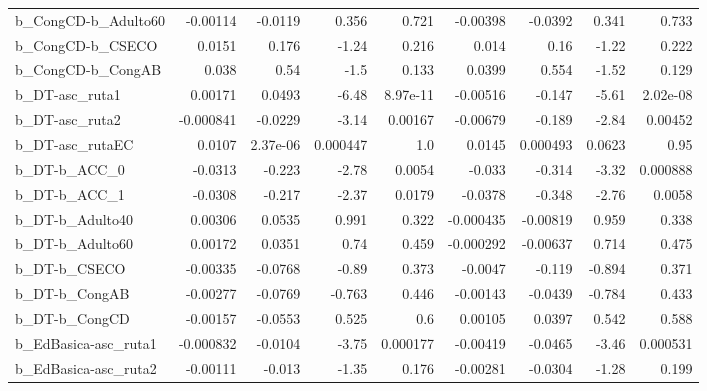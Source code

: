 \begin{tabular}{lrrrrrrrr}
b\_CongCD-b\_Adulto60        &    -0.00114 &      -0.0119 &     0.356 &    0.721 &   -0.00398 &     -0.0392 &        0.341 &         0.733 \\
b\_CongCD-b\_CSECO           &      0.0151 &        0.176 &     -1.24 &    0.216 &      0.014 &        0.16 &        -1.22 &         0.222 \\
b\_CongCD-b\_CongAB          &       0.038 &         0.54 &      -1.5 &    0.133 &     0.0399 &       0.554 &        -1.52 &         0.129 \\
b\_DT-asc\_ruta1             &     0.00171 &       0.0493 &     -6.48 & 8.97e-11 &   -0.00516 &      -0.147 &        -5.61 &      2.02e-08 \\
b\_DT-asc\_ruta2             &   -0.000841 &      -0.0229 &     -3.14 &  0.00167 &   -0.00679 &      -0.189 &        -2.84 &       0.00452 \\
b\_DT-asc\_rutaEC            &      0.0107 &     2.37e-06 &  0.000447 &      1.0 &     0.0145 &    0.000493 &       0.0623 &          0.95 \\
b\_DT-b\_ACC\_0               &     -0.0313 &       -0.223 &     -2.78 &   0.0054 &     -0.033 &      -0.314 &        -3.32 &      0.000888 \\
b\_DT-b\_ACC\_1               &     -0.0308 &       -0.217 &     -2.37 &   0.0179 &    -0.0378 &      -0.348 &        -2.76 &        0.0058 \\
b\_DT-b\_Adulto40            &     0.00306 &       0.0535 &     0.991 &    0.322 &  -0.000435 &    -0.00819 &        0.959 &         0.338 \\
b\_DT-b\_Adulto60            &     0.00172 &       0.0351 &      0.74 &    0.459 &  -0.000292 &    -0.00637 &        0.714 &         0.475 \\
b\_DT-b\_CSECO               &    -0.00335 &      -0.0768 &     -0.89 &    0.373 &    -0.0047 &      -0.119 &       -0.894 &         0.371 \\
b\_DT-b\_CongAB              &    -0.00277 &      -0.0769 &    -0.763 &    0.446 &   -0.00143 &     -0.0439 &       -0.784 &         0.433 \\
b\_DT-b\_CongCD              &    -0.00157 &      -0.0553 &     0.525 &      0.6 &    0.00105 &      0.0397 &        0.542 &         0.588 \\
b\_EdBasica-asc\_ruta1       &   -0.000832 &      -0.0104 &     -3.75 & 0.000177 &   -0.00419 &     -0.0465 &        -3.46 &      0.000531 \\
b\_EdBasica-asc\_ruta2       &    -0.00111 &       -0.013 &     -1.35 &    0.176 &   -0.00281 &     -0.0304 &        -1.28 &         0.199 \\

\end{tabular}
